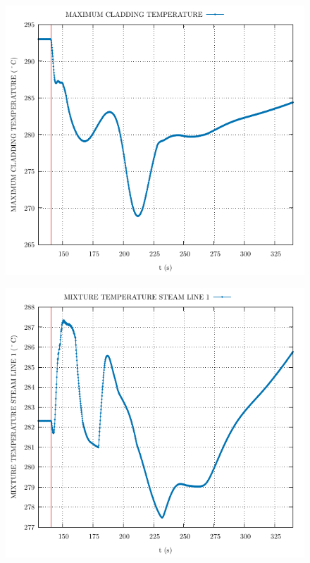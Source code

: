 \documentclass{article}
\begin{document}
\begin{multicols}{2}
\begin{figure}[H]
\end{figure}
\begin{figure}[H]
\centering
\includegraphics[width=\linewidth]{./graphs/MAXIMUM CLADDING TEMPERATURE_comp.pdf}
\end{figure}
\begin{figure}[H]
\centering
\includegraphics[width=\linewidth]{./graphs/MIXTURE TEMPERATURE STEAM LINE 1_comp.pdf}

\end{figure}
\end{multicols}
\end{document}
